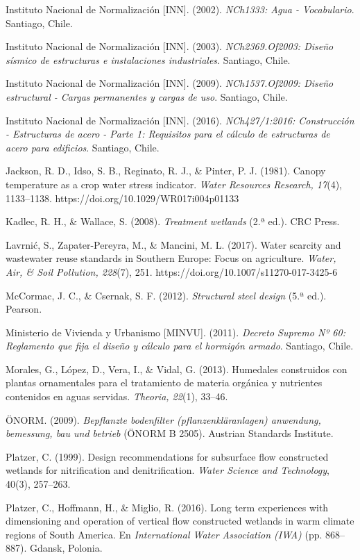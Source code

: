 \documentclass[12pt, letterpaper]{report}
\begin{document}
Instituto Nacional de Normalización [INN]. (2002). \textit{NCh1333: Agua - Vocabulario}. Santiago, Chile.

Instituto Nacional de Normalización [INN]. (2003). \textit{NCh2369.Of2003: Diseño sísmico de estructuras e instalaciones industriales}. Santiago, Chile.

Instituto Nacional de Normalización [INN]. (2009). \textit{NCh1537.Of2009: Diseño estructural - Cargas permanentes y cargas de uso}. Santiago, Chile.

Instituto Nacional de Normalización [INN]. (2016). \textit{NCh427/1:2016: Construcción - Estructuras de acero - Parte 1: Requisitos para el cálculo de estructuras de acero para edificios}. Santiago, Chile.

Jackson, R. D., Idso, S. B., Reginato, R. J., \& Pinter, P. J. (1981). Canopy temperature as a crop water stress indicator. \textit{Water Resources Research, 17}(4), 1133--1138. https://doi.org/10.1029/WR017i004p01133

Kadlec, R. H., \& Wallace, S. (2008). \textit{Treatment wetlands} (2.ª ed.). CRC Press.

Lavrnić, S., Zapater-Pereyra, M., \& Mancini, M. L. (2017). Water scarcity and wastewater reuse standards in Southern Europe: Focus on agriculture. \textit{Water, Air, \& Soil Pollution, 228}(7), 251. https://doi.org/10.1007/s11270-017-3425-6

McCormac, J. C., \& Csernak, S. F. (2012). \textit{Structural steel design} (5.ª ed.). Pearson.

Ministerio de Vivienda y Urbanismo [MINVU]. (2011). \textit{Decreto Supremo Nº 60: Reglamento que fija el diseño y cálculo para el hormigón armado}. Santiago, Chile.

Morales, G., López, D., Vera, I., \& Vidal, G. (2013). Humedales construidos con plantas ornamentales para el tratamiento de materia orgánica y nutrientes contenidos en aguas servidas. \textit{Theoria, 22}(1), 33--46.

ÖNORM. (2009). \textit{Bepflanzte bodenfilter (pflanzenkläranlagen) anwendung, bemessung, bau und betrieb} (ÖNORM B 2505). Austrian Standards Institute.

Platzer, C. (1999). Design recommendations for subsurface flow constructed wetlands for nitrification and denitrification. \textit{Water Science and Technology}, 40(3), 257--263.

Platzer, C., Hoffmann, H., \& Miglio, R. (2016). Long term experiences with dimensioning and operation of vertical flow constructed wetlands in warm climate regions of South America. En \textit{International Water Association (IWA)} (pp. 868--887). Gdansk, Polonia.
\end{document}

